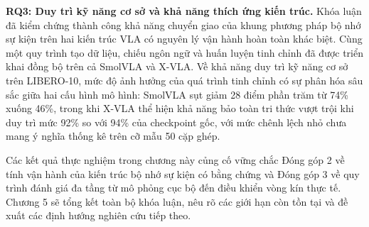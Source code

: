 \textbf{RQ3: Duy trì kỹ năng cơ sở và khả năng thích ứng kiến trúc.} Khóa luận đã kiểm chứng thành công khả năng chuyển giao của khung phương pháp bộ nhớ sự kiện trên hai kiến trúc VLA có nguyên lý vận hành hoàn toàn khác biệt. Cùng một quy trình tạo dữ liệu, chiếu ngôn ngữ và huấn luyện tinh chỉnh đã được triển khai đồng bộ trên cả SmolVLA và X-VLA. Về khả năng duy trì kỹ năng cơ sở trên LIBERO-10, mức độ ảnh hưởng của quá trình tinh chỉnh có sự phân hóa sâu sắc giữa hai cấu hình mô hình: SmolVLA sụt giảm 28 điểm phần trăm từ 74\% xuống 46\%, trong khi X-VLA thể hiện khả năng bảo toàn tri thức vượt trội khi duy trì mức 92\% so với 94\% của checkpoint gốc, với mức chênh lệch nhỏ chưa mang ý nghĩa thống kê trên cỡ mẫu 50 cặp ghép.

Các kết quả thực nghiệm trong chương này củng cố vững chắc Đóng góp 2 về tính vận hành của kiến trúc bộ nhớ sự kiện có bằng chứng và Đóng góp 3 về quy trình đánh giá đa tầng từ mô phỏng cục bộ đến điều khiển vòng kín thực tế. Chương 5 sẽ tổng kết toàn bộ khóa luận, nêu rõ các giới hạn còn tồn tại và đề xuất các định hướng nghiên cứu tiếp theo.
